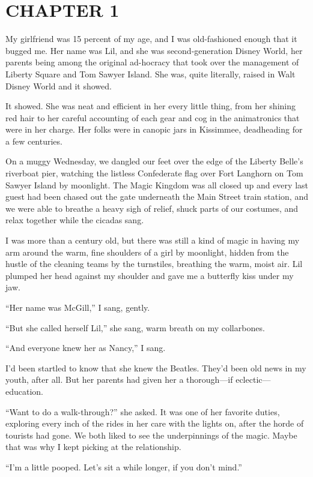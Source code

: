 \section{CHAPTER 1}

My girlfriend was 15 percent of my age, and I was old-fashioned
enough that it bugged me. Her name was Lil, and she was
second-generation Disney World, her parents being among the
original ad-hocracy that took over the management of Liberty Square
and Tom Sawyer Island. She was, quite literally, raised in Walt
Disney World and it showed.

It showed. She was neat and efficient in her every little thing,
from her shining red hair to her careful accounting of each gear
and cog in the animatronics that were in her charge. Her folks were
in canopic jars in Kissimmee, deadheading for a few centuries.

On a muggy Wednesday, we dangled our feet over the edge of the
Liberty Belle's riverboat pier, watching the listless Confederate
flag over Fort Langhorn on Tom Sawyer Island by moonlight. The
Magic Kingdom was all closed up and every last guest had been
chased out the gate underneath the Main Street train station, and
we were able to breathe a heavy sigh of relief, shuck parts of our
costumes, and relax together while the cicadas sang.

I was more than a century old, but there was still a kind of magic
in having my arm around the warm, fine shoulders of a girl by
moonlight, hidden from the hustle of the cleaning teams by the
turnstiles, breathing the warm, moist air. Lil plumped her head
against my shoulder and gave me a butterfly kiss under my jaw.

“Her name was McGill,” I sang, gently.

“But she called herself Lil,” she sang, warm breath on my
collarbones.

“And everyone knew her as Nancy,” I sang.

I'd been startled to know that she knew the Beatles. They'd been
old news in my youth, after all. But her parents had given her a
thorough—if eclectic—education.

“Want to do a walk-through?” she asked. It was one of her favorite
duties, exploring every inch of the rides in her care with the
lights on, after the horde of tourists had gone. We both liked to
see the underpinnings of the magic. Maybe that was why I kept
picking at the relationship.

“I'm a little pooped. Let's sit a while longer, if you don't
mind.”

